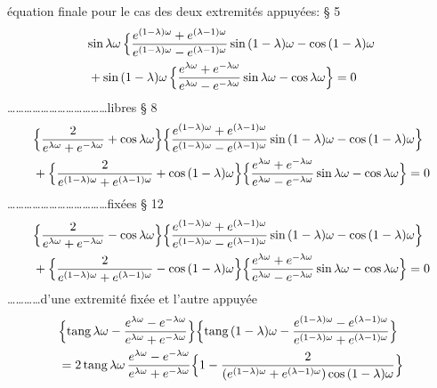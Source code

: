 \documentclass[11pt,a4paper]{article}
\begin{document}
équation finale pour le cas des deux extremités appuyées: § 5
\begin{align*}
&\text{sin}\,\lambda\omega\,\Bigl\{\frac{e^{(1-\lambda)\omega} + e^{(\lambda-1)\omega}}{e^{(1-\lambda)\omega} - e^{(\lambda-1)\omega}}\,\text{sin}\,(1-\lambda)\omega - \text{cos}\,(1-\lambda)\omega \\
&+ \text{sin}\,(1-\lambda)\omega\,\Bigl\{\frac{e^{\lambda\omega} + e^{-\lambda\omega}}{e^{\lambda\omega} - e^{-\lambda\omega}}\,\text{sin}\,\lambda\omega - \text{cos}\,\lambda\omega\Bigr\} = 0
\end{align*}
\ldots\ldots\ldots\ldots\ldots\ldots\ldots\ldots\ldots\ldots\ldots\ldots libres § 8
\begin{align*}
&\Bigl\{\frac{2}{e^{\lambda\omega} + e^{-\lambda\omega}} + \text{cos}\,\lambda\omega\Bigr\}\Bigl\{\frac{e^{(1-\lambda)\omega} + e^{(\lambda-1)\omega}}{e^{(1-\lambda)\omega} - e^{(\lambda-1)\omega}}\,\text{sin}\,(1-\lambda)\omega - \text{cos}\,(1-\lambda)\omega\Bigr\} \\
&+ \Bigl\{\frac{2}{e^{(1-\lambda)\omega} + e^{(\lambda-1)\omega}} + \text{cos}\,(1-\lambda)\omega\Bigr\}\Bigl\{\frac{e^{\lambda\omega} + e^{-\lambda\omega}}{e^{\lambda\omega} - e^{-\lambda\omega}}\,\text{sin}\,\lambda\omega - \text{cos}\,\lambda\omega\Bigr\} = 0
\end{align*}
\ldots\ldots\ldots\ldots\ldots\ldots\ldots\ldots\ldots\ldots\ldots\ldots fixées § 12
\begin{align*}
&\Bigl\{\frac{2}{e^{\lambda\omega} + e^{-\lambda\omega}} - \text{cos}\,\lambda\omega\Bigr\}\Bigl\{\frac{e^{(1-\lambda)\omega} + e^{(\lambda-1)\omega}}{e^{(1-\lambda)\omega} - e^{(\lambda-1)\omega}}\,\text{sin}\,(1-\lambda)\omega - \text{cos}\,(1-\lambda)\omega\Bigr\} \\
&+ \Bigl\{\frac{2}{e^{(1-\lambda)\omega} + e^{(\lambda-1)\omega}} - \text{cos}\,(1-\lambda)\omega\Bigr\}\Bigl\{\frac{e^{\lambda\omega} + e^{-\lambda\omega}}{e^{\lambda\omega} - e^{-\lambda\omega}}\,\text{sin}\,\lambda\omega - \text{cos}\,\lambda\omega\Bigr\} = 0
\end{align*}
\ldots\ldots\ldots\ldots d'une extremité fixée et l'autre appuyée
\begin{align*}
&\Bigl\{\text{tang}\,\lambda\omega - \frac{e^{\lambda\omega} - e^{-\lambda\omega}}{e^{\lambda\omega} + e^{-\lambda\omega}}\Bigr\}\Bigl\{\text{tang}\,(1-\lambda)\omega - \frac{e^{(1-\lambda)\omega} - e^{(\lambda-1)\omega}}{e^{(1-\lambda)\omega} + e^{(\lambda-1)\omega}}\Bigr\} \\
&= 2\,\text{tang}\,\lambda\omega\,\frac{e^{\lambda\omega} - e^{-\lambda\omega}}{e^{\lambda\omega} + e^{-\lambda\omega}}\Bigl\{1 - \frac{2}{(e^{(1-\lambda)\omega} + e^{(\lambda-1)\omega})\,\text{cos}\,(1-\lambda)\omega}\Bigr\}
\end{align*}
\end{document}
